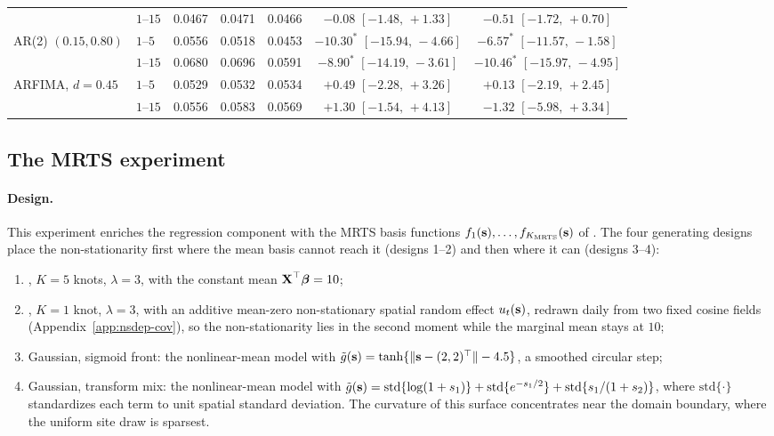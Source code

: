 \documentclass[12pt]{article}
\begin{document}
\begin{table}[htbp]
\begin{tabular}{@{}llccccc@{}}
 & $1$--$15$ & 0.0467 & 0.0471 & 0.0466 & $-0.08$ {\tiny $[-1.48,\,+1.33]$} & $-0.51$ {\tiny $[-1.72,\,+0.70]$} \\
\addlinespace
AR(2) $(0.15, 0.80)$ & $1$--$5$ & 0.0556 & 0.0518 & 0.0453 & $-10.30^{*}$ {\tiny $[-15.94,\,-4.66]$} & $-6.57^{*}$ {\tiny $[-11.57,\,-1.58]$} \\
 & $1$--$15$ & 0.0680 & 0.0696 & 0.0591 & $-8.90^{*}$ {\tiny $[-14.19,\,-3.61]$} & $-10.46^{*}$ {\tiny $[-15.97,\,-4.95]$} \\
\addlinespace
ARFIMA, $d = 0.45$ & $1$--$5$ & 0.0529 & 0.0532 & 0.0534 & $+0.49$ {\tiny $[-2.28,\,+3.26]$} & $+0.13$ {\tiny $[-2.19,\,+2.45]$} \\
 & $1$--$15$ & 0.0556 & 0.0583 & 0.0569 & $+1.30$ {\tiny $[-1.54,\,+4.13]$} & $-1.32$ {\tiny $[-5.98,\,+3.34]$} \\
\bottomrule
\end{tabular}
\end{table}

\subsection{The MRTS experiment}\label{sec:sim-mrts-design}

\paragraph{Design.}
This experiment enriches the regression component with the MRTS basis functions $f_1(\mbox{\bf s}), \ldots, f_{K_{\mathrm{MRTS}}}(\mbox{\bf s})$ of .  The four generating designs place the non-stationarity first where the mean basis cannot reach it (designs 1--2) and then where it can (designs 3--4):
\begin{enumerate}[leftmargin=3em]
  \item \Skewt, $K = 5$ knots, $\lambda = 3$, with the constant mean $\mbox{\bf X}^\top \mbox{\boldmath $\beta$} = 10$;
  \item \Skewt, $K = 1$ knot, $\lambda = 3$, with an additive mean-zero non-stationary spatial random effect $u_t(\mbox{\bf s})$, redrawn daily from two fixed cosine fields (Appendix~\ref{app:nsdep-cov}), so the non-stationarity lies in the second moment while the marginal mean stays at $10$;
  \item Gaussian, sigmoid front: the nonlinear-mean model  with $\tilde g(\mbox{\bf s}) = \tanh\{\lVert \mbox{\bf s} - (2, 2)^\top \rVert - 4.5\}$, a smoothed circular step;
  \item Gaussian, transform mix: the nonlinear-mean model  with $\tilde g(\mbox{\bf s}) = \mathrm{std}\{\log(1 + s_1)\} + \mathrm{std}\{e^{-s_1/2}\} + \mathrm{std}\{s_1 / (1 + s_2)\}$, where $\mathrm{std}\{\cdot\}$ standardizes each term to unit spatial standard deviation.  The curvature of this surface concentrates near the domain boundary, where the uniform site draw is sparsest.
\end{enumerate}
\end{document}
